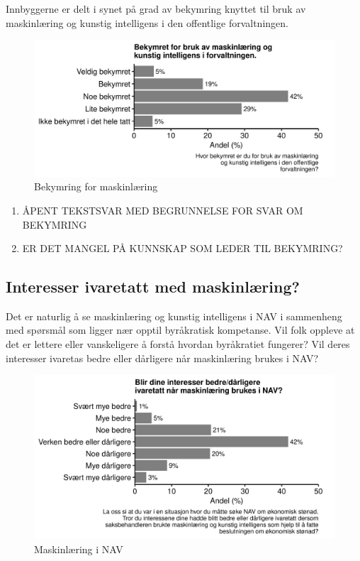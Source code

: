 \documentclass[
]{book}
\begin{document}
Innbyggerne er delt i synet på grad av bekymring knyttet til bruk av maskinlæring og kunstig intelligens i den offentlige forvaltningen.

\begin{figure}
\centering
\includegraphics{figs/png/fig_ml_worried.png}
\caption{Bekymring for maskinlæring}
\end{figure}

\begin{enumerate}
\def\labelenumi{\arabic{enumi}.}
\item
  ÅPENT TEKSTSVAR MED BEGRUNNELSE FOR SVAR OM BEKYMRING
\item
  ER DET MANGEL PÅ KUNNSKAP SOM LEDER TIL BEKYMRING?
\end{enumerate}

\hypertarget{interesser-ivaretatt-med-maskinluxe6ring}{%
\subsection{Interesser ivaretatt med maskinlæring?}\label{interesser-ivaretatt-med-maskinluxe6ring}}

Det er naturlig å se maskinlæring og kunstig intelligens i NAV i sammenheng med spørsmål som ligger nær opptil byråkratisk kompetanse.
Vil folk oppleve at det er lettere eller vanskeligere å forstå hvordan byråkratiet fungerer?
Vil deres interesser ivaretas bedre eller dårligere når maskinlæring brukes i NAV?

\begin{figure}
\centering
\includegraphics{figs/png/fig_nav_ml_helps_interest.png}
\caption{Maskinlæring i NAV}
\end{figure}
\end{document}

